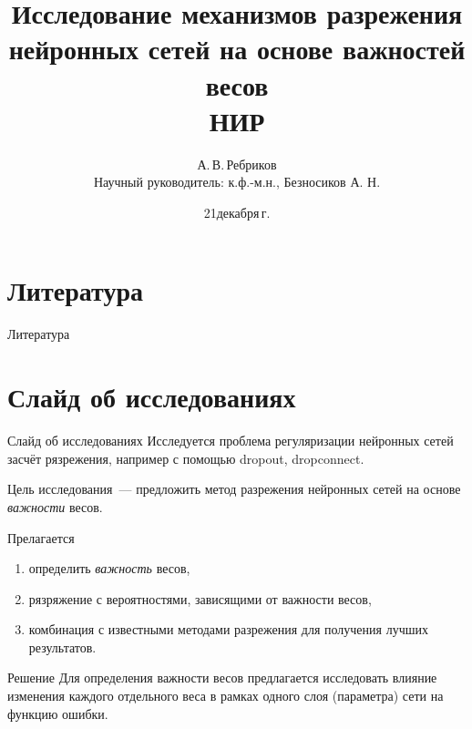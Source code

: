 \documentclass[10pt,pdf,hyperref={unicode}]{beamer}
\title[Исследование механизмов разрежения нейронных сетей на основе важностей весов]{Исследование механизмов разрежения нейронных сетей на основе важностей весов \\ НИР}
\author{А.\,В.\,Ребриков \\ Научный руководитель:	к.ф.-м.н., Безносиков А. Н.}
\institute[]{Московский физико-технический институт}
\date[2024]{\small 21\;декабря\;2024\,г.}
\begin{document}
\begin{frame}
\titlepage
\end{frame}



\section{Литература}
\begin{frame}{Литература}


\end{frame}


\section{Слайд об исследованиях}
\begin{frame}{Слайд об исследованиях}
\bigskip
Исследуется проблема регуляризации нейронных сетей засчёт рязрежения, например с помощью dropout, dropconnect.
\begin{block}{Цель исследования~---}
предложить метод разрежения нейронных сетей на основе \emph{важности} весов.
\end{block}
\begin{block}{Прелагается}
\justifying
\begin{enumerate}[1)]
\item определить \emph{важность} весов,
\item рязряжение с вероятностями, зависящими от важности весов,
\item комбинация с известными методами разрежения для получения лучших результатов.
\end{enumerate}
\end{block}
\begin{block}{Решение}
Для определения важности весов предлагается исследовать влияние изменения каждого отдельного веса в рамках одного слоя (параметра) сети на функцию ошибки.
\end{block}
\end{frame}

\end{document}
